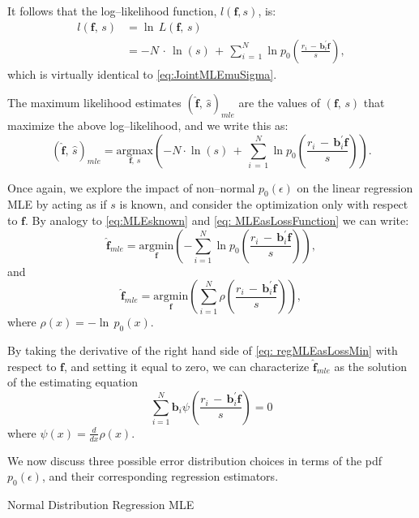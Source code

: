 \documentclass[graybox,envcountchap,sectrefs]{svmono}\usepackage[]{graphicx}\usepackage[]{xcolor}
\begin{document}
\begin{appendices}
It follows that the log--likelihood function, $l(\mathbf{f},s)$,
is:
\begin{align}
l(\mathbf{f},\,s) & =\ln\,L(\mathbf{f},\,s)\nonumber \\
 & =-N\,\cdot\,\ln(s)\,+\,\sum_{i\,=\,1}^{N}\ln p_{0}\left(\frac{r_{i}\,-\,\mathbf{b}_{i}^{\prime}\mathbf{f}}{s}\right),\label{eq: regLogLikelihood}
\end{align}
which is virtually identical to \eqref{eq:JointMLEmuSigma}. 

The maximum likelihood estimates $(\hat{\mathbf{f}},\,\hat{s})_{mle}$
are the values of $(\mathbf{f},\,s)$ that maximize the above log--likelihood,
and we write this as:
\begin{equation}
(\hat{\mathbf{f}},\,\hat{s})_{mle}=\underset{\mathbf{f},\,s}{\mathrm{argmax}}\left(-N\cdot\ln(s)\,+\,\sum_{i\,=\,1}^{N}\ln p_{0}\left(\frac{r_{i}\,-\,\mathbf{b}_{i}^{\prime}\mathbf{f}}{s}\right)\right).\label{eq: regJointMLE}
\end{equation}

Once again, we explore the impact of non--normal $p_{0}(\epsilon)$
on the linear regression MLE by acting as if $s$ is known, and consider
the optimization only with respect to $\mathbf{f}$. By analogy to
\eqref{eq:MLEsknown} and \eqref{eq: MLEasLossFunction} we can write:
\begin{equation}
\hat{\mathbf{f}}_{mle}=\underset{\mathbf{f}}{\mathrm{argmin}}\left(-\sum_{i=1}^{N}\ln p_{0}\left(\frac{r_{i}\,-\,\mathbf{b}_{i}^{\prime}\mathbf{f}}{s}\right)\right),\label{eq: regMLEsknown}
\end{equation}
and 
\begin{equation}
\hat{\mathbf{f}}_{mle}=\underset{\mathbf{f}}{\mathrm{argmin}}\left(\sum_{i=1}^{N}\rho\left(\frac{r_{i}\,-\,\mathbf{b}_{i}^{\prime}\mathbf{f}}{s}\right)\right),\label{eq: regMLEasLossMin}
\end{equation}
where $\rho(x)=-\ln\,p_{0}(x)$.

By taking the derivative of the right hand side of \eqref{eq: regMLEasLossMin}
with respect to $\mathbf{f}$, and setting it equal to zero, we can
characterize $\hat{\mathbf{f}}_{mle}$ as the solution of the estimating
equation
\begin{equation}
\sum_{i=1}^{N}\mathbf{b}_{i}\psi\left(\frac{r_{i}\,-\,\mathbf{b}_{i}^{\prime}\mathbf{f}}{s}\right)=0\label{eq: regMLEestEqn}
\end{equation}
where $\psi(x)=\frac{d}{dx}\rho(x)$.

We now discuss three possible error distribution choices in terms
of the pdf $p_{0}(\epsilon)$, and their corresponding regression
estimators.
\begin{example}
Normal Distribution Regression MLE


\end{example}
\end{appendices}
\end{document}

